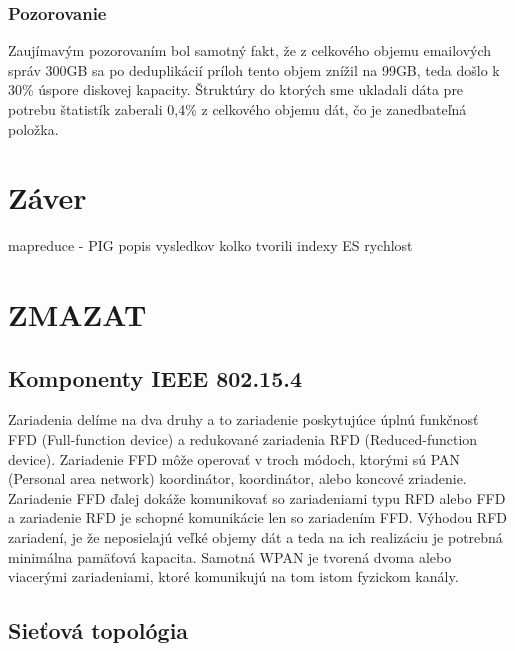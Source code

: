 \documentclass[11pt,twoside,a4paper]{book}
\begin{document}
\subsection*{Pozorovanie}
Zaujímavým pozorovaním bol samotný fakt, že z celkového objemu emailových správ 300GB sa po deduplikácií príloh tento objem znížil na 99GB, teda došlo k 30\% úspore diskovej kapacity. Štruktúry do ktorých sme ukladali dáta pre potrebu štatistík zaberali 0,4\% z celkového objemu dát, čo je zanedbateľná položka.


\chapter{Záver}
mapreduce - PIG
popis vysledkov
kolko tvorili indexy
ES rychlost 




















\chapter{ZMAZAT}
\section{Komponenty IEEE 802.15.4}
Zariadenia delíme na dva druhy a to zariadenie poskytujúce úplnú funkčnosť FFD (Full-function device) a redukované zariadenia RFD (Reduced-function device). Zariadenie FFD môže operovať v troch módoch, ktorými sú PAN (Personal area network) koordinátor, koordinátor, alebo koncové zriadenie. Zariadenie FFD ďalej dokáže komunikovať so zariadeniami typu RFD alebo FFD a zariadenie RFD je schopné komunikácie len so zariadením FFD. Výhodou RFD zariadení, je že neposielajú veľké objemy dát a teda na ich realizáciu je potrebná minimálna pamäťová kapacita. 
Samotná WPAN je tvorená dvoma alebo viacerými zariadeniami, ktoré komunikujú na tom istom fyzickom kanály.

\newpage 

\section{Sieťová topológia}
\end{document}
